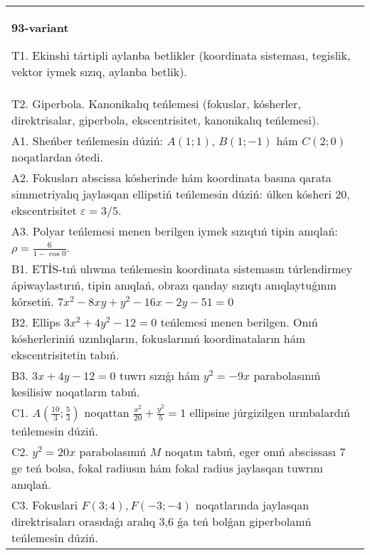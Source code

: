 \documentclass{article}
\begin{document}
\begin{tabular}{m{17cm}}
\textbf{93-variant}
\newline

T1. Ekinshi tártipli aylanba betlikler (koordinata sisteması, tegislik, vektor iymek sızıq, aylanba betlik).\\

T2. Giperbola. Kanonikalıq teńlemesi (fokuslar, kósherler, direktrisalar, giperbola, ekscentrisitet, kanonikalıq teńlemesi).\\

A1. Sheńber teńlemesin dúziń: $A (1;1) $, $B (1;-1) $ hám $C (2;0) $ noqatlardan ótedi.\\

A2. Fokusları abscissa kósherinde hám koordinata basına qarata simmetriyalıq jaylasqan ellipstiń teńlemesin dúziń: úlken kósheri $20$, ekscentrisitet $\varepsilon=3/5$.\\

A3. Polyar teńlemesi menen berilgen iymek sızıqtıń tipin anıqlań: $\rho=\frac{6}{1-\cos 0}$.\\

B1. ETİS-tıń ulıwma teńlemesin koordinata sistemasın túrlendirmey ápiwaylastırıń, tipin anıqlań, obrazı qanday sızıqtı anıqlaytuǵının kórsetiń. $7x^{2} - 8xy + y^{2} - 16x - 2y - 51 = 0$  \\

B2. Ellips $3x^{2} + 4y^{2} - 12 = 0$ teńlemesi menen berilgen. Onıń kósherleriniń uzınlıqların, fokuslarınıń koordinataların hám ekscentrisitetin tabıń.  \\

B3. $3x + 4y - 12 = 0$ tuwrı sızıǵı hám $y^{2} = - 9x$ parabolasınıń kesilisiw noqatların tabıń.  \\

C1. $A(\frac{10}{3};\frac{5}{3})$ noqattan $\frac{x^{2}}{20} + \frac{y^{2}}{5} = 1$ ellipsine júrgizilgen urınbalardıń teńlemesin dúziń.  \\

C2. $y^{2} = 20x$ parabolasınıń $M$ noqatın tabıń, eger onıń abscissası 7 ge teń bolsa, fokal radiusın hám fokal radius jaylasqan tuwrını anıqlań.\\

C3. Fokuslari $F(3;4), F(-3;-4)$ noqatlarında jaylasqan direktrisaları orasıdaǵı aralıq 3,6 ǵa teń bolǵan giperbolanıń teńlemesin dúziń.  \\

\end{tabular}
\vspace{1cm}
\end{document}

